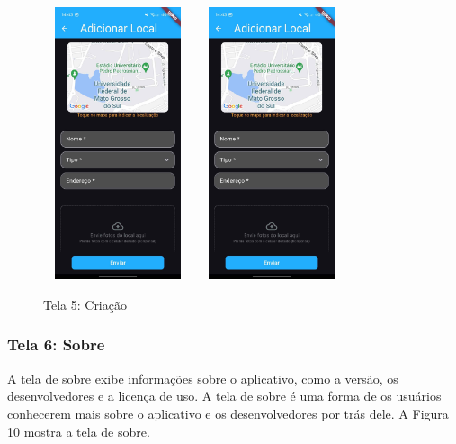     \begin{figure}[h]
        \centering
        \includegraphics[width=44mm,height=80mm]{imagens/criacao.jpg}
        \hspace{10mm}
        \includegraphics[width=44mm,height=80mm]{imagens/criacao.jpg}
        \caption{\scriptsize Tela 5: Criação}
        \footnotesize  {}
        \label{fig:tela5}
    \end{figure}

    \FloatBarrier

\subsubsection{Tela 6: Sobre}

    A tela de sobre exibe informações sobre o aplicativo, como a versão, os desenvolvedores e a licença de uso. A tela de sobre é uma forma de os usuários conhecerem mais sobre o aplicativo e os desenvolvedores por trás dele. A Figura 10 mostra a tela de sobre.

